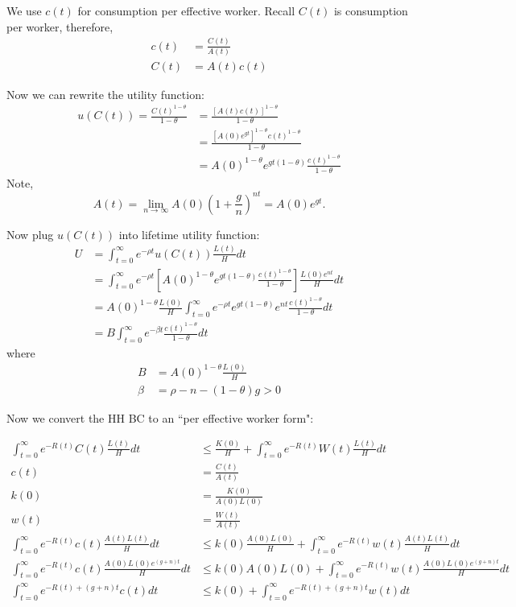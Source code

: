 \documentclass[12pt]{article}
\begin{document}
We use $ c(t) $ for consumption per effective worker. Recall $ C(t) $ is consumption
per worker, therefore, 
\begin{align*}
c(t) &= \frac{C(t)}{A(t)}\\
C(t) &= A(t)c(t)
\end{align*}

Now we can rewrite the utility function:
\begin{align*}
u(C(t)) = \frac{C(t)^{1 - \theta}}{1 - \theta}
&= \frac{[A(t)c(t)]^{1 - \theta}}{1 - \theta}\\
&= \frac{[A(0)e^{gt}]^{1 - \theta}c(t)^{1 - \theta}}{1 - \theta}\\
&= A(0)^{1 - \theta}e^{gt(1 - \theta)}\frac{c(t)^{1 - \theta}}{1 - \theta}
\end{align*}
Note, 
\begin{equation*}
A(t) = \lim_{n \to \infty}A(0)(1 + \frac{g}{n})^{nt} = A(0)e^{gt}.
\end{equation*}


Now plug $ u(C(t)) $ into lifetime utility function:
\begin{align*}
U &= \int_{t = 0}^{\infty } e^{ - \rho t}u(C(t))\frac{L(t)}{H}d t\\
&= \int_{t = 0}^{\infty } e^{ - \rho t}
\left[ 
A(0)^{1 - \theta}e^{gt(1 - \theta)}\frac{c(t)^{1 - \theta}}{1 - \theta}
\right] 
\frac{L(0)e^{nt}}{H}d t\\
&= A(0)^{1 - \theta}\frac{L(0)}{H} \int_{t = 0}^{\infty } 
e^{ - \rho t} e^{gt(1 - \theta)} e^{nt}\frac{c(t)^{1 - \theta}}{1 - \theta}d t\\
&= B \int_{t = 0}^{\infty } e^{ - \beta t} \frac{c(t)^{1 - \theta}}{1 - \theta}d t
\end{align*}
where
\begin{align*}
B &= A(0)^{1 - \theta} \frac{L(0)}{H}\\
\beta &= \rho - n - (1 - \theta)g > 0
\end{align*}


Now we convert the HH BC to an ``per effective worker form":

\begin{align*}
\int_{t = 0}^{\infty } e^{ - R(t)}C(t)\frac{L(t)}{H}d t &\le 
\frac{K(0)}{H} + \int_{t = 0}^{\infty } e^{ - R(t)}W(t)\frac{L(t)}{H}d t\\
c(t)&= \frac{C(t)}{A(t)}\\
k(0)&= \frac{K(0)}{A(0)L(0)}\\
w(t)&= \frac{W(t)}{A(t)}\\
\int_{t = 0}^{\infty } e^{ - R(t)}c(t)\frac{A(t)L(t)}{H}d t & \le 
k(0)\frac{A(0)L(0)}{H} + \int_{t = 0}^{\infty } e^{ - R(t)}w(t)\frac{A(t)L(t)}{H}d t\\
\int_{t = 0}^{\infty } e^{ - R(t)}c(t)\frac{A(0)L(0)e^{(g + n)t}}{H}d t & \le 
k(0)A(0)L(0) + \int_{t = 0}^{\infty } e^{ - R(t)}w(t)\frac{A(0)L(0)e^{(g + n)t}}{H}d t\\
\int_{t = 0}^{\infty } e^{ - R(t) + (g + n)t}c(t)d t & \le 
k(0) + \int_{t = 0}^{\infty } e^{ - R(t) + (g + n)t}w(t)d t
\end{align*}
\end{document}
